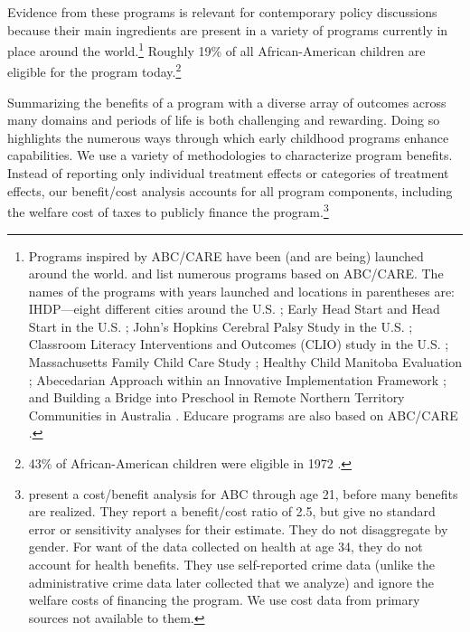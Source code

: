 Evidence from these programs is relevant for contemporary policy discussions because their main ingredients are present in a variety of programs currently in place around the world.\footnote{Programs inspired by ABC/CARE have been (and are being) launched around the world. \citet{Sparling_2010_Highlights} and \citet{Ramey_Ramey_Lanzi_2014_Interventions} list numerous programs based on ABC/CARE. The names of the programs with years launched and locations in parentheses are: IHDP---eight different cities around the U.S. \citep{Spiker-etal_1997_Helping}; Early Head Start and Head Start in the U.S. \citep{Schneider_McDonald-eds_2007_Scale-Up_Vol-1}; John's Hopkins Cerebral Palsy Study in the U.S. \citep{Sparling_2010_Highlights}; Classroom Literacy Interventions and Outcomes (CLIO) study in the U.S. \citep{Sparling_2010_Highlights}; Massachusetts Family Child Care Study \citep{Collins_etal_2010_Massachusetts-Study}; Healthy Child Manitoba Evaluation \citep{Healthy_Child_Manitoba_2015_Starting-Early}; Abecedarian Approach within an Innovative Implementation Framework \citep{Jensen_Nielsen_2016_ABC-Programme-Pilot}; and Building a Bridge into Preschool in Remote Northern Territory Communities in Australia \citep{UMonash_Dataset_2015_URL}. Educare programs are also based on ABC/CARE \citep{Educare_2014_Research_Agenda,Yazejian_Bryant_2012_Educare}.} Roughly 19\% of all African-American children are eligible for the program today.\footnote{43\% of African-American children were eligible in 1972 \citep{Garcia_2016_National-Implementation-ECI}.}

Summarizing the benefits of a program with a diverse array of outcomes across many domains and periods of life is both challenging and rewarding. Doing so highlights the numerous ways through which early childhood programs enhance capabilities. We use a variety of methodologies to characterize program benefits. Instead of reporting only individual treatment effects or categories of treatment effects, our benefit/cost analysis accounts for all program components, including the welfare cost of taxes to publicly finance the program.\footnote{\cite{Barnett_Masse_2002_benefitcost,Barnett_Masse_2007_EER} present a cost/benefit analysis for ABC through age 21, before many benefits are realized. They report a benefit/cost ratio of 2.5, but give no standard error or sensitivity analyses for their estimate. They do not disaggregate by gender. For want of the data collected on health at age 34, they do not account for health benefits. They use self-reported crime data (unlike the administrative crime data later collected that we analyze) and ignore the welfare costs of financing the program. We use cost data from primary sources not available to them.}

